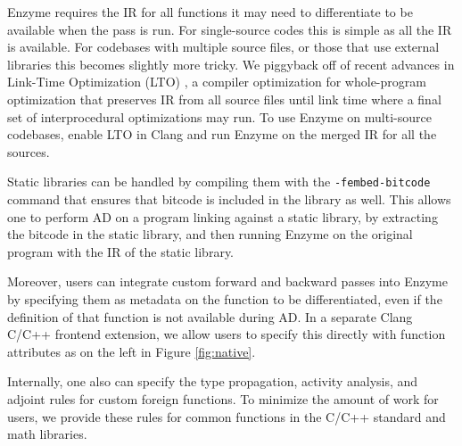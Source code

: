 Enzyme requires the IR for all functions it may need to differentiate to be available when the pass is run. For single-source codes this is simple as all the IR is available. For codebases with multiple source files, or those that use external libraries this becomes slightly more tricky. We piggyback off of recent advances in Link-Time Optimization (LTO) \cite{Johnson2017-lm, TODO}, a compiler optimization for whole-program optimization that preserves IR from all source files until link time where a final set of interprocedural optimizations may run. To use Enzyme on multi-source codebases, enable LTO in Clang and run Enzyme on the merged IR for all the sources.

Static libraries can be handled by compiling them with the \texttt{-fembed-bitcode} command that ensures that bitcode is included in the library as well. This allows one to perform AD on a program linking against a static library, by extracting the bitcode in the static library, and then running Enzyme on the original program with the IR of the static library.

Moreover, users can integrate custom forward and backward passes into Enzyme by specifying them as metadata on the function to be differentiated, even if the definition of that function is not available during AD. In a separate Clang C/C++ frontend extension, we allow users to specify this directly with function attributes as on the left in Figure \ref{fig:native}.

Internally, one also can specify the type propagation, activity analysis, and adjoint rules for custom foreign functions. To minimize the amount of work for users, we provide these rules for common functions in the C/C++ standard and math libraries.


